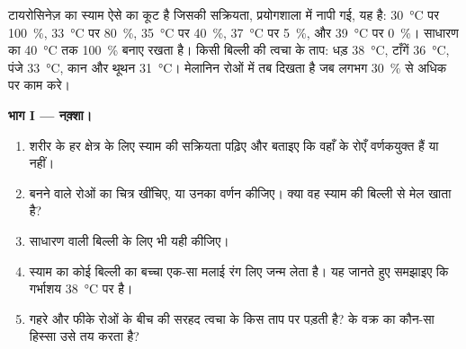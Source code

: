 \begin{problem}
\label{pb:g11:enzymes-and-phenotype:1}
टायरोसिनेज़  का स्याम  ऐसे  का कूट है जिसकी सक्रियता,
प्रयोगशाला में नापी गई, यह है: \qty{30}{\celsius} पर \qty{100}{\percent},
\qty{33}{\celsius} पर \qty{80}{\percent}, \qty{35}{\celsius} पर
\qty{40}{\percent}, \qty{37}{\celsius} पर \qty{5}{\percent}, और
\qty{39}{\celsius} पर \qty{0}{\percent}। साधारण  का 
\qty{40}{\celsius} तक \qty{100}{\percent} बनाए रखता है। किसी बिल्ली की
त्वचा के ताप: धड़ \qty{38}{\celsius}, टाँगें \qty{36}{\celsius}, पंजे
\qty{33}{\celsius}, कान और थूथन \qty{31}{\celsius}। मेलानिन रोओं में तब
दिखता है जब  लगभग \qty{30}{\percent} से अधिक पर काम करे।

\medskip
\noindent\textbf{भाग I --- नक़्शा।}
\begin{enumerate}
  \item शरीर के हर क्षेत्र के लिए स्याम  की सक्रियता पढ़िए और
        बताइए कि वहाँ के रोएँ वर्णकयुक्त हैं या नहीं।
  \item बनने वाले रोओं का चित्र खींचिए, या उनका वर्णन कीजिए। क्या वह
        स्याम की बिल्ली से मेल खाता है?
  \item साधारण  वाली बिल्ली के लिए भी यही कीजिए।
  \item स्याम का कोई बिल्ली का बच्चा एक-सा मलाई रंग लिए जन्म लेता है। यह
        जानते हुए समझाइए कि गर्भाशय \qty{38}{\celsius} पर है।
  \item गहरे और फीके रोओं के बीच की सरहद त्वचा के किस ताप पर पड़ती है?
         के वक्र का कौन-सा हिस्सा उसे तय करता है?
\end{enumerate}


\end{problem}
